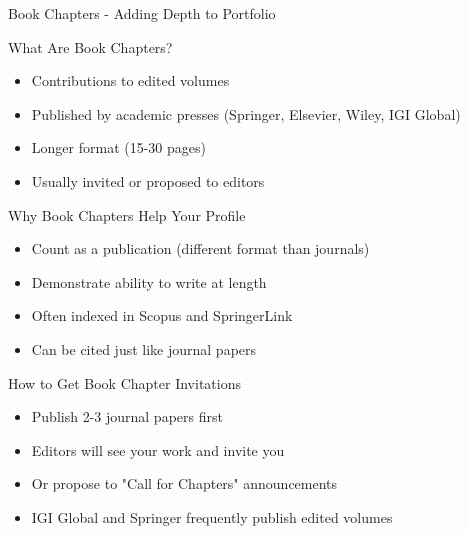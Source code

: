 \documentclass[11pt]{beamer}
\begin{document}
	\begin{frame}{Book Chapters - Adding Depth to Portfolio}
		\scriptsize
		\begin{block}{What Are Book Chapters?}
			\begin{itemize}
				\item Contributions to edited volumes
				\item Published by academic presses (Springer, Elsevier, Wiley, IGI Global)
				\item Longer format (15-30 pages)
				\item Usually invited or proposed to editors
			\end{itemize}
		\end{block}
		\begin{block}{Why Book Chapters Help Your Profile}
			\begin{itemize}
				\item Count as a publication (different format than journals)
				\item Demonstrate ability to write at length
				\item Often indexed in Scopus and SpringerLink
				\item Can be cited just like journal papers
			\end{itemize}
		\end{block}
		\begin{block}{How to Get Book Chapter Invitations}
			\begin{itemize}
				\item Publish 2-3 journal papers first
				\item Editors will see your work and invite you
				\item Or propose to "Call for Chapters" announcements
				\item IGI Global and Springer frequently publish edited volumes
			\end{itemize}
		\end{block}
	\end{frame}
	
\end{document}
